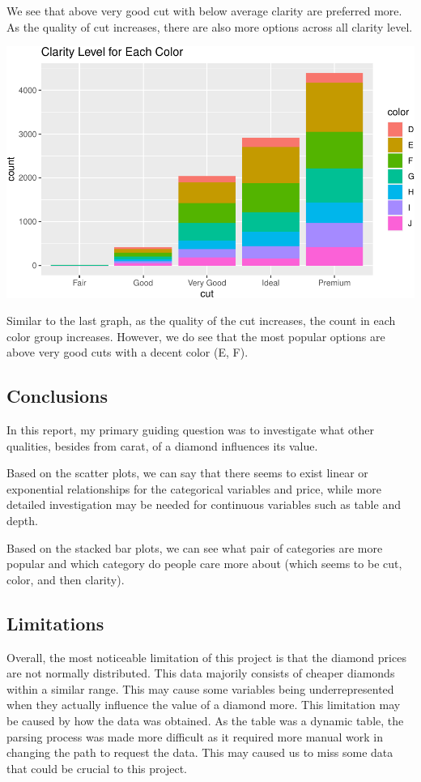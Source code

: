 \documentclass[
]{article}
\begin{document}
We see that above very good cut with below average clarity are preferred
more. As the quality of cut increases, there are also more options
across all clarity level.

\begin{center}\includegraphics[width=0.8\linewidth]{Methods_and_Results_files/figure-latex/unnamed-chunk-19-1} \end{center}

Similar to the last graph, as the quality of the cut increases, the
count in each color group increases. However, we do see that the most
popular options are above very good cuts with a decent color (E, F).

\hypertarget{conclusions}{%
\subsection{Conclusions}\label{conclusions}}

In this report, my primary guiding question was to investigate what
other qualities, besides from carat, of a diamond influences its value.

Based on the scatter plots, we can say that there seems to exist linear
or exponential relationships for the categorical variables and price,
while more detailed investigation may be needed for continuous variables
such as table and depth.

Based on the stacked bar plots, we can see what pair of categories are
more popular and which category do people care more about (which seems
to be cut, color, and then clarity).

\hypertarget{limitations}{%
\subsection{Limitations}\label{limitations}}

Overall, the most noticeable limitation of this project is that the
diamond prices are not normally distributed. This data majorily consists
of cheaper diamonds within a similar range. This may cause some
variables being underrepresented when they actually influence the value
of a diamond more. This limitation may be caused by how the data was
obtained. As the table was a dynamic table, the parsing process was made
more difficult as it required more manual work in changing the path to
request the data. This may caused us to miss some data that could be
crucial to this project.
\end{document}
